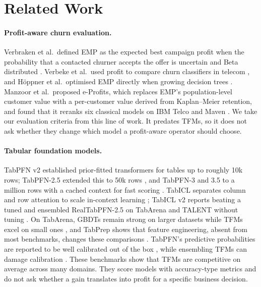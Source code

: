 \documentclass[11pt]{article}
\newcommand{\tfms}{TFMs\xspace}
\begin{document}
\section{Related Work}

\paragraph{Profit-aware churn evaluation.}
Verbraken et al.\ defined EMP as the expected best campaign profit when the probability that a contacted churner
accepts the offer is uncertain and Beta distributed \cite{verbraken2013emp}. Verbeke et al.\ used profit to compare
churn classifiers in telecom \cite{verbeke2012newinsights}, and H\"oppner et al.\ optimised EMP directly when growing
decision trees \cite{hoppner2020proftree}. Manzoor et al.\ proposed e-Profits, which replaces EMP's population-level
customer value with a per-customer value derived from Kaplan--Meier retention, and found that it reranks six classical
models on IBM Telco and Maven \cite{manzoor2025eprofits}. We take our evaluation criteria from this line of work. It
predates \tfms, so it does not ask whether they change which model a profit-aware operator should choose.

\paragraph{Tabular foundation models.}
TabPFN v2 \cite{hollmann2025tabpfn} established prior-fitted transformers for tables up to roughly 10k rows;
TabPFN-2.5 extended this to 50k rows \cite{priorlabs2025tabpfn25}, and TabPFN-3 and 3.5 to a million rows with a cached
context for fast scoring \cite{priorlabs2026tabpfn3,priorlabs2026tabpfn35}. TabICL separates column and row attention to
scale in-context learning \cite{qu2025tabicl}; TabICL v2 reports beating a tuned and ensembled RealTabPFN-2.5 on TabArena
and TALENT without tuning \cite{qu2026tabiclv2}. On TabArena, GBDTs remain strong on larger datasets while \tfms excel on
small ones \cite{erickson2025tabarena}, and TabPrep shows that feature engineering, absent from most benchmarks,
changes these comparisons \cite{tschalzev2026tabprep}. TabPFN's predictive probabilities are reported to be well
calibrated out of the box \cite{tanna2025tabtune}, while ensembling \tfms can damage calibration
\cite{tanna2026ensembling}. These benchmarks show that \tfms are competitive on average across many domains. They score
models with accuracy-type metrics and do not ask whether a gain translates into profit for a specific business
decision.
\end{document}

